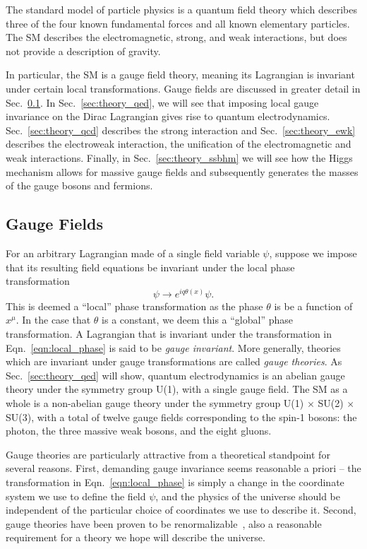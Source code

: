The standard model of particle physics is a quantum field theory which describes three of the four known fundamental forces and all known elementary particles.
The SM describes the electromagnetic, strong, and weak interactions, but does not provide a description of gravity.

In particular, the SM is a gauge field theory, meaning its Lagrangian is invariant under certain local transformations.
Gauge fields are discussed in greater detail in Sec.~\ref{sec:theory_gauge}.
In Sec.~\ref{sec:theory_qed}, we will see that imposing local gauge invariance on the Dirac Lagrangian gives rise to quantum electrodynamics.
Sec.~\ref{sec:theory_qcd} describes the strong interaction and Sec.~\ref{sec:theory_ewk} describes the electroweak interaction, the unification of the electromagnetic and weak interactions.
Finally, in Sec.~\ref{sec:theory_ssbhm} we will see how the Higgs mechanism allows for massive gauge fields and subsequently generates the masses of the gauge bosons and fermions.

\subsection{Gauge Fields} \label{sec:theory_gauge}
For an arbitrary Lagrangian made of a single field variable $\psi$, suppose we impose that its resulting field equations be invariant under the local phase transformation
\begin{equation} \label{eqn:local_phase}
    \psi \to e^{i q \theta(x)} \psi.
\end{equation}
This is deemed a ``local'' phase transformation as the phase $\theta$ is be a function of $x^\mu$.
In the case that $\theta$ is a constant, we deem this a ``global'' phase transformation.
A Lagrangian that is invariant under the transformation in Eqn.~\ref{eqn:local_phase} is said to be \emph{gauge invariant}.
More generally, theories which are invariant under gauge transformations are called \emph{gauge theories}.
As Sec.~\ref{sec:theory_qed} will show, quantum electrodynamics is an abelian gauge theory under the symmetry group U(1), with a single gauge field.
The SM as a whole is a non-abelian gauge theory under the symmetry group U(1) $\times$ SU(2) $\times$ SU(3), with a total of twelve gauge fields corresponding to the spin-1 bosons: the photon, the three massive weak bosons, and the eight gluons.

Gauge theories are particularly attractive from a theoretical standpoint for several reasons.
First, demanding gauge invariance seems reasonable a priori -- the transformation in Eqn.~\ref{eqn:local_phase} is simply a change in the coordinate system we use to define the field $\psi$, and the physics of the universe should be independent of the particular choice of coordinates we use to describe it.
Second, gauge theories have been proven to be renormalizable~\cite{tHooft:1971qjg}, also a reasonable requirement for a theory we hope will describe the universe.

